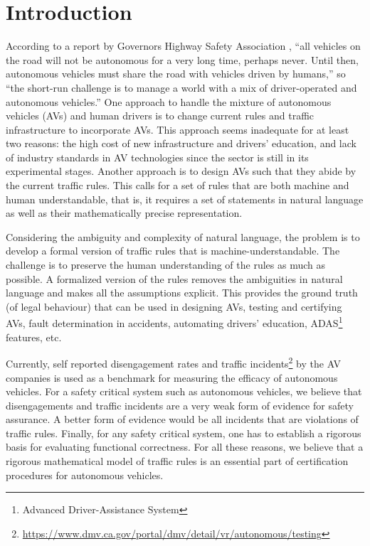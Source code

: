 \section{Introduction}
According to a report by Governors Highway Safety Association \cite{Hedlund.2017}, ``all vehicles on the road will not be autonomous for a very long time, perhaps never. Until then, autonomous vehicles must share the road with vehicles driven by humans,'' so ``the short-run challenge is to manage a world with a mix of driver-operated and autonomous vehicles.''
One approach to handle the mixture of autonomous vehicles (AVs) and human drivers is to change current rules and traffic infrastructure to incorporate AVs.
This approach seems inadequate for at least two reasons:
the high cost of new infrastructure and drivers' education, and lack of industry standards in AV technologies since the sector is still in its experimental stages.
Another approach is to design AVs such that they abide by the current traffic rules.
This calls for a set of rules that are both machine and human understandable, that is, it requires a set of statements in natural language as well as their mathematically precise representation.


Considering the ambiguity and complexity of natural language, the problem is to develop a formal version of traffic rules that is machine-understandable.
The challenge is to preserve the human understanding of the rules as much as possible.
A formalized version of the rules removes the ambiguities in natural language and makes all the assumptions explicit.
This provides the ground truth (of legal behaviour) that can be used in designing AVs, testing and certifying AVs, fault determination in accidents, automating drivers' education, ADAS\footnote{Advanced Driver-Assistance System} features, etc.

Currently, self reported disengagement rates and traffic incidents\footnote{\url{https://www.dmv.ca.gov/portal/dmv/detail/vr/autonomous/testing}} by the AV companies is used as a benchmark for measuring the efficacy of autonomous vehicles. For a safety critical system such as autonomous vehicles, we believe that disengagements and traffic incidents are a very weak form of evidence for safety assurance. A better form of evidence would be all incidents that are violations of traffic rules. Finally, for any safety critical system, one has to establish a rigorous basis for evaluating functional correctness. For all these reasons, we believe that a rigorous mathematical model of traffic rules is an essential part of certification procedures for autonomous vehicles.

